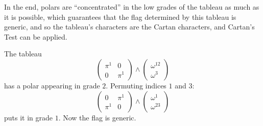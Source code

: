 In the end, polars are ``concentrated'' in the low grades of the tableau as much as it is possible, which guarantees that the flag determined by this tableau is generic, and so the tableau's characters are the Cartan characters, and Cartan's Test can be applied.


\begin{example}
    The tableau 
    \[\left(\begin{array}{|c|c}
        \boxed{\pi^1} & 0 \\
        0 & \pi^1
    \end{array}\right)\wedge 
    \left(\begin{array}{c}
        \hline \omega^{12}\\
        \hline \omega^3
    \end{array}\right)
    \]
    has a polar appearing in grade $2$. Permuting indices $1$ and $3$:
    \[\left(\begin{array}{c|c}
        0 & \pi^1 \\
        \boxed{\pi^1} & 0
    \end{array}\right)\wedge 
    \left(\begin{array}{c}
        \omega^{1}\\
        \hline \omega^{23}
    \end{array}\right)
    \]
    puts it in grade $1$. Now the flag is generic.
\end{example}



